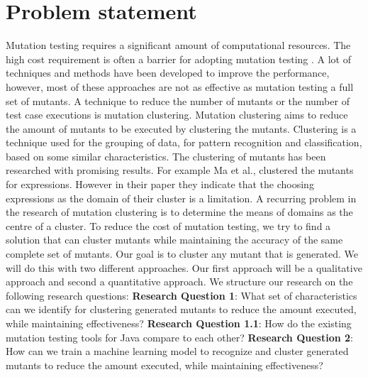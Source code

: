 \documentclass[../main]{subfiles}
\begin{document}
\section{Problem statement}
Mutation testing requires a significant amount of computational resources\cite{Kintis2016EffectiveMutation}. 
The high cost requirement is often a barrier for adopting mutation testing \cite{Pizzoleto2019}.
A lot of techniques and methods have been developed to improve the performance, however, most of these approaches are not as effective as mutation testing a full set of mutants\cite{Pizzoleto2019,Yao2014}. 
\newline
A technique to reduce the number of mutants or the number of test case executions is mutation clustering.
Mutation clustering aims to reduce the amount of mutants to be executed by clustering the mutants\cite{Ma2016,Yu2019PossibilityScope}.
Clustering is a technique used for the grouping of data, for pattern recognition and classification, based on some similar characteristics\cite{Alsabti1997}.
The clustering of mutants has been researched with promising results\cite{Ji2009,Wilinski2015,Ma2016}. For example Ma et al., \cite{Ma2016} clustered the mutants for expressions. 
However in their paper they indicate that the choosing expressions as the domain of their cluster is a limitation.
A recurring problem in the research of mutation clustering is to determine the means of domains as the centre of a cluster\cite{Ji2009,Wilinski2015,Ma2016,Wei2021SpectralTesting}.
\newline
To reduce the cost of mutation testing, we try to find a solution that can cluster mutants while maintaining the accuracy of the same complete set of mutants. 
Our goal is to cluster any mutant that is generated.
We will do this with two different approaches.
Our first approach will be a qualitative approach and second a quantitative approach. 
We structure our research on the following research questions:
\newline
\textbf{Research Question 1}: What set of characteristics can we identify for clustering generated mutants to reduce the amount executed, while maintaining effectiveness?
\newline
\textbf{Research Question 1.1}: How do the existing mutation testing tools for Java compare to each other?
\newline
\textbf{Research Question 2}: How can we train a machine learning model to recognize and cluster generated mutants to reduce the amount executed, while maintaining effectiveness?
\newline
\end{document}
